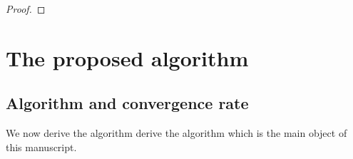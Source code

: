 \documentclass{article} %
\begin{document}
\begin{proof}
\end{proof}



\section{The proposed algorithm}
\label{sec:algorithm}
\subsection{Algorithm and convergence rate}
We now derive the algorithm derive the algorithm which is the main object of
this manuscript.
\end{document}
